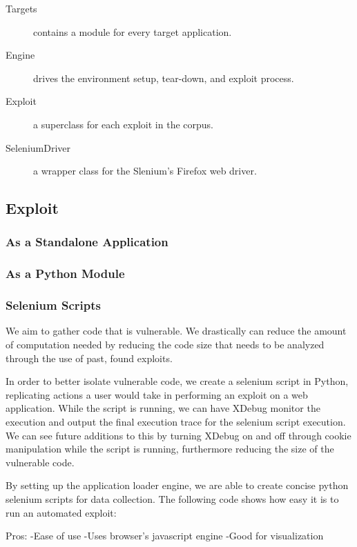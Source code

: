 \documentclass[letterpaper,twocolumn,10pt]{article}
\begin{document}
 \begin{description}
   \item[Targets] contains a module for every target application.
   \item[Engine] drives the environment setup, tear-down, and exploit process.
   \item[Exploit] a superclass for each exploit in the corpus.
   \item[SeleniumDriver] a wrapper class for the Slenium's Firefox web driver.
 \end{description}

\subsection{Exploit}

\subsubsection{As a Standalone Application}

\subsubsection{As a Python Module}

\subsubsection{Selenium Scripts}

We aim to gather code that is vulnerable.  We drastically can reduce the amount of computation needed by reducing the code size that needs to be analyzed through the use of past, found exploits.  

In order to better isolate vulnerable code, we create a selenium script in Python, replicating actions a user would take in performing an exploit on a web application.  While the script is running, we can have XDebug monitor the execution and output the final execution trace for the selenium script execution.  We can see future additions to this by turning XDebug on and off through cookie manipulation while the script is running, furthermore reducing the size of the vulnerable code.

By setting up the application loader engine, we are able to create concise python selenium scripts for data collection.  The following code shows how easy it is to run an automated exploit:

Pros:
-Ease of use
-Uses browser's javascript engine
-Good for visualization
\end{document}
